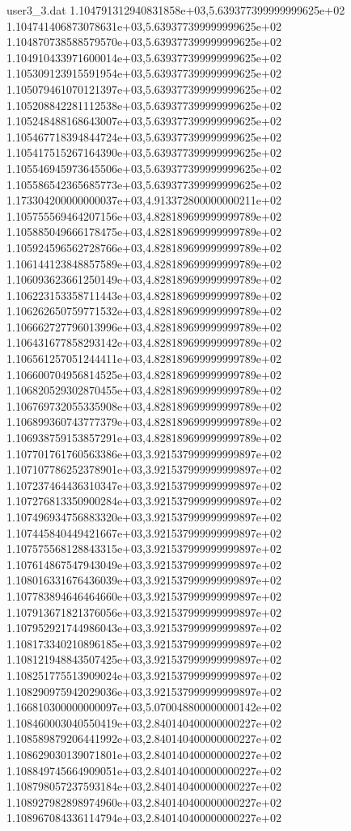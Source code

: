 \begin{filecontents}{user3_3.dat}
1.104791312940831858e+03,5.639377399999999625e+02
1.104741406873078631e+03,5.639377399999999625e+02
1.104870738588579570e+03,5.639377399999999625e+02
1.104910433971600014e+03,5.639377399999999625e+02
1.105309123915591954e+03,5.639377399999999625e+02
1.105079461070121397e+03,5.639377399999999625e+02
1.105208842281112538e+03,5.639377399999999625e+02
1.105248488168643007e+03,5.639377399999999625e+02
1.105467718394844724e+03,5.639377399999999625e+02
1.105417515267164390e+03,5.639377399999999625e+02
1.105546945973645506e+03,5.639377399999999625e+02
1.105586542365685773e+03,5.639377399999999625e+02
1.173304200000000037e+03,4.913372800000000211e+02
1.105755569464207156e+03,4.828189699999999789e+02
1.105885049666178475e+03,4.828189699999999789e+02
1.105924596562728766e+03,4.828189699999999789e+02
1.106144123848857589e+03,4.828189699999999789e+02
1.106093623661250149e+03,4.828189699999999789e+02
1.106223153358711443e+03,4.828189699999999789e+02
1.106262650759771532e+03,4.828189699999999789e+02
1.106662727796013996e+03,4.828189699999999789e+02
1.106431677858293142e+03,4.828189699999999789e+02
1.106561257051244411e+03,4.828189699999999789e+02
1.106600704956814525e+03,4.828189699999999789e+02
1.106820529302870455e+03,4.828189699999999789e+02
1.106769732055335908e+03,4.828189699999999789e+02
1.106899360743777379e+03,4.828189699999999789e+02
1.106938759153857291e+03,4.828189699999999789e+02
1.107701761760563386e+03,3.921537999999999897e+02
1.107107786252378901e+03,3.921537999999999897e+02
1.107237464436310347e+03,3.921537999999999897e+02
1.107276813350900284e+03,3.921537999999999897e+02
1.107496934756883320e+03,3.921537999999999897e+02
1.107445840449421667e+03,3.921537999999999897e+02
1.107575568128843315e+03,3.921537999999999897e+02
1.107614867547943049e+03,3.921537999999999897e+02
1.108016331676436039e+03,3.921537999999999897e+02
1.107783894646464660e+03,3.921537999999999897e+02
1.107913671821376056e+03,3.921537999999999897e+02
1.107952921744986043e+03,3.921537999999999897e+02
1.108173340210896185e+03,3.921537999999999897e+02
1.108121948843507425e+03,3.921537999999999897e+02
1.108251775513909024e+03,3.921537999999999897e+02
1.108290975942029036e+03,3.921537999999999897e+02
1.166810300000000097e+03,5.070048800000000142e+02
1.108460003040550419e+03,2.840140400000000227e+02
1.108589879206441992e+03,2.840140400000000227e+02
1.108629030139071801e+03,2.840140400000000227e+02
1.108849745664909051e+03,2.840140400000000227e+02
1.108798057237593184e+03,2.840140400000000227e+02
1.108927982898974960e+03,2.840140400000000227e+02
1.108967084336114794e+03,2.840140400000000227e+02

\end{filecontents}

